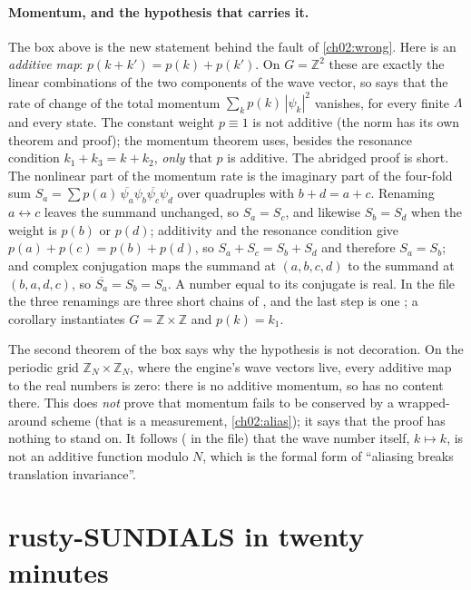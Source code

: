 \paragraph{Momentum, and the hypothesis that carries it.} The box above is the new statement behind the fault of \cref{ch02:wrong}. Here  is an \emph{additive map}: $p(k+k')=p(k)+p(k')$.
On $G=\mathbb Z^2$ these are exactly the linear combinations of the two components of the wave vector, so  says that the rate of change of the total momentum
$\sum_k p(k)\,|\psi_k|^2$ vanishes, for every finite $\Lambda$ and every state. The constant weight $p\equiv1$ is not additive (the norm has its own theorem and proof); the momentum theorem uses, besides the resonance condition $k_1+k_3=k+k_2$, \emph{only} that $p$ is additive. The abridged proof is short. The nonlinear part of the momentum rate is
the imaginary part of the four-fold sum $S_a=\sum p(a)\,\overline{\psi_a}\psi_b\overline{\psi_c}\psi_d$ over quadruples with $b+d=a+c$. Renaming $a\leftrightarrow c$ leaves the summand unchanged, so
$S_a=S_c$, and likewise $S_b=S_d$ when the weight is $p(b)$ or $p(d)$; additivity and the resonance condition give $p(a)+p(c)=p(b)+p(d)$, so $S_a+S_c=S_b+S_d$ and therefore $S_a=S_b$; and
complex conjugation maps the summand at $(a,b,c,d)$ to the summand at $(b,a,d,c)$, so $\overline{S_a}=S_b=S_a$. A number equal to its conjugate is real. In the file the three renamings are
three short chains of , and the last step is one ; a corollary instantiates $G=\mathbb Z\times\mathbb Z$ and $p(k)=k_1$.

The second theorem of the box says why the hypothesis is not decoration. On the periodic grid $\mathbb Z_N\times\mathbb Z_N$, where the engine's wave vectors live, every additive map to the real numbers is
zero: there is no additive momentum, so  has no content there. This does \emph{not} prove that momentum fails to be conserved by a wrapped-around scheme (that is a
measurement, \cref{ch02:alias}); it says that the proof has nothing to stand on. It follows ( in the file) that the wave number itself, $k\mapsto k$, is not an additive
function modulo $N$, which is the formal form of ``aliasing breaks translation invariance''.

\section{rusty-SUNDIALS in twenty minutes}\label{ch02:solver}

